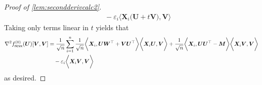 \documentclass[10pt]{article}
\newcommand{\eps}{\ensuremath{\varepsilon}}
\renewcommand{\t}{^{\top}}
\theoremstyle{definition}
\begin{document}
\begin{proof}[Proof of \cref{lem:secondderivcalc2}]
\begin{align}
     &\quad  - \eps_i\bigg \langle \bm{X}_i \big( \bm{U} + t \bm{V} \big), \bm{V} \bigg\rangle
\end{align}
Taking only terms linear in $t$ yields that
\begin{align}
    \nabla^2 f^{(0)}_{{\sf ncvx}}(\bm{U})[ \bm{V}, \bm{V}] &= \frac{1}{\sqrt{n}} \sum_{i=1}^{n}\frac{1}{\sqrt{n}} \bigg \langle \bm{X}_i, \bm{U W}\t + \bm{VU}\t  \bigg \rangle \bigg \langle \bm{X}_i \bm{U}, \bm{V} \bigg \rangle + \frac{1}{\sqrt{n}}\bigg \langle \bm{X}_i , \bm{UU}\t - \bm{M} \bigg \rangle \bigg \langle \bm{X}_i \bm{V}, \bm{V} \bigg \rangle  \\
    &\quad - \eps_i \bigg \langle \bm{X}_i \bm{V}, \bm{V} \bigg \rangle 
\end{align}
as desired. 
\end{proof}
\end{document}
